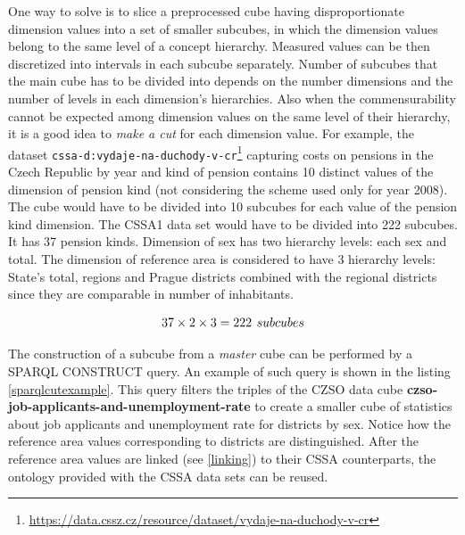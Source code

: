 One way to solve is to slice a preprocessed cube having disproportionate dimension values into a set of smaller subcubes, in which the dimension values belong to the same level of a concept hierarchy. Measured values can be then discretized into intervals in each subcube separately. Number of subcubes that the main cube has to be divided into depends on the number dimensions and the number of levels in each dimension's hierarchies. Also when the commensurability cannot be expected among dimension values on the same level of their hierarchy, it is a good idea to \textit{make a cut} for each dimension value. For example, the dataset \verb|cssa-d:vydaje-na-duchody-v-cr|\footnote{\href{https://data.cssz.cz/resource/dataset/vydaje-na-duchody-v-cr}{https://data.cssz.cz/resource/dataset/vydaje-na-duchody-v-cr}} capturing costs on pensions in the Czech Republic by year and kind of pension contains 10 distinct values of the dimension of pension kind (not considering the scheme used only for year 2008). The cube would have to be divided into 10 subcubes for each value of the pension kind dimension. The CSSA1 data set would have to be divided into 222 subcubes. It has 37 pension kinds. Dimension of sex has two hierarchy levels: each sex and total. The dimension of reference area is considered to have 3 hierarchy levels: State's total, regions and Prague districts combined with the regional districts since they are comparable in number of inhabitants.

$$
37 \times 2 \times 3 = 222\hspace{0.4em}subcubes
$$

The construction of a subcube from a \textit{master} cube can be performed by a SPARQL CONSTRUCT query. An example of such query is shown in the listing \ref{sparqlcutexample}. This query filters the triples of the CZSO data cube \textbf{czso-job-applicants-and-unemployment-rate} to create a smaller cube of statistics about job applicants and unemployment rate for districts by sex. Notice how the reference area values corresponding to districts are distinguished. After the reference area values are linked (see \ref{linking}) to their CSSA counterparts, the ontology provided with the CSSA data sets can be reused.

